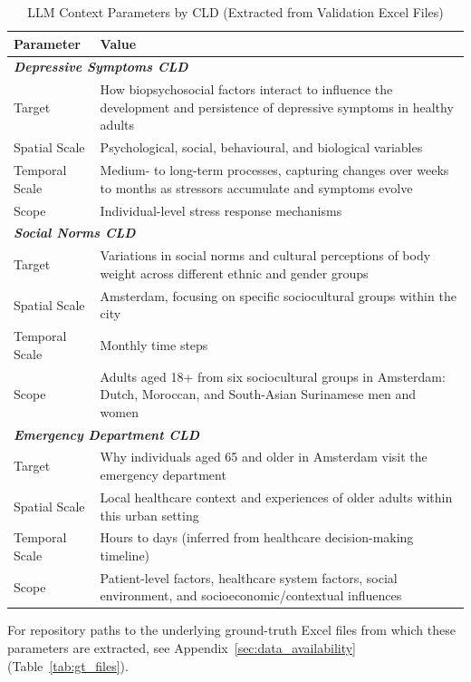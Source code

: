\begin{table}[H]
\centering
\caption[LLM context parameters by CLD]{LLM Context Parameters by CLD (Extracted from Validation Excel Files)}
\label{tab:cld_context}
\footnotesize
\begin{tabularx}{\textwidth}{@{}l X@{}}
\toprule
\textbf{Parameter} & \textbf{Value} \\
\midrule
\multicolumn{2}{l}{\textit{\textbf{Depressive Symptoms CLD}}} \\
Target & How biopsychosocial factors interact to influence the development and persistence of depressive symptoms in healthy adults \\
Spatial Scale & Psychological, social, behavioural, and biological variables \\
Temporal Scale & Medium- to long-term processes, capturing changes over weeks to months as stressors accumulate and symptoms evolve \\
Scope & Individual-level stress response mechanisms \\
\midrule
\multicolumn{2}{l}{\textit{\textbf{Social Norms CLD}}} \\
Target & Variations in social norms and cultural perceptions of body weight across different ethnic and gender groups \\
Spatial Scale & Amsterdam, focusing on specific sociocultural groups within the city \\
Temporal Scale & Monthly time steps \\
Scope & Adults aged 18+ from six sociocultural groups in Amsterdam: Dutch, Moroccan, and South-Asian Surinamese men and women \\
\midrule
\multicolumn{2}{l}{\textit{\textbf{Emergency Department CLD}}} \\
Target & Why individuals aged 65 and older in Amsterdam visit the emergency department \\
Spatial Scale & Local healthcare context and experiences of older adults within this urban setting \\
Temporal Scale & Hours to days (inferred from healthcare decision-making timeline) \\
Scope & Patient-level factors, healthcare system factors, social environment, and socioeconomic/contextual influences \\
\bottomrule
\end{tabularx}
\end{table}
For repository paths to the underlying ground-truth Excel files from which these parameters are extracted, see Appendix~\ref{sec:data_availability} (Table~\ref{tab:gt_files}).

